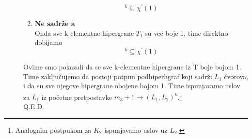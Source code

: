 \documentclass[a4paper]{article}
\begin{document}
\begin{description}
\begin{enumerate}
\begin{equation}
					[ T ]^{k} \subseteq \chi^\prime (1)
				\end{equation}
			\item  \textbf{Ne sadrže a} \\
				Onda sve k-elementne hipergrane $T_1$ su već boje 1, time direktno dobijamo
				\begin{equation}
					[ T ]^k \subseteq \chi^\prime (1)
				\end{equation}
		\end{enumerate}
		Ovime smo pokazali da se sve k-elementne hipergrane iz T boje bojom 1. Time zaključujemo da postoji potpun podhiperhgraf koji sadrži $L_1$ čvorova, i da su sve njegove hipergrane obojene bojom 1. Time ispunjavamo uslov za $L_1$ iz početne pretpostavke $m_3 + 1 \rightarrow (L_1, L_2)^k$.\footnote{Analognim postpukom za $K_2$ ispunjavamo uslov uz $L_2$.}\\
		{\large Q.E.D.}
	\end{description}
\end{document}
